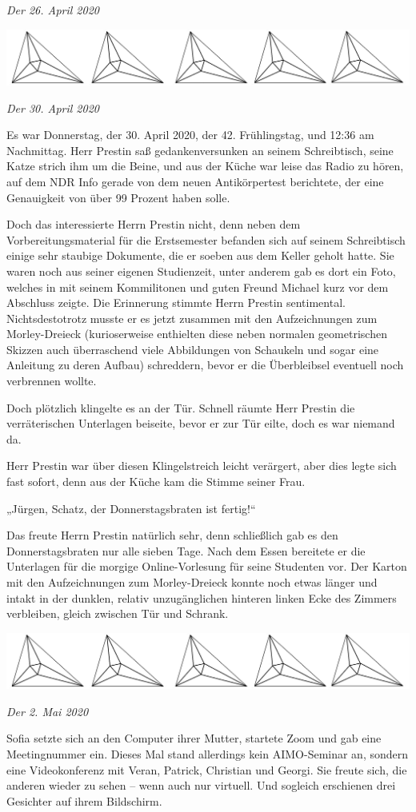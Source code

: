 \documentclass[oneside]{memoir}
\newcommand{\parasep}{
\bigskip
\bigskip
\begin{center} 
   \includegraphics[scale=.08]{parasep5.jpg} 
\end{center}
\bigskip
\bigskip
}
\begin{document}
\textit{Der 26. April 2020} \\ 

     
\parasep

\textit{Der 30. April 2020}

Es war Donnerstag, der 30. April 2020, der 42. Frühlingstag, und 12:36 am Nachmittag. Herr Prestin saß gedankenversunken an seinem Schreibtisch, seine Katze strich ihm um die Beine, und aus der Küche war leise das Radio zu hören, auf dem NDR Info gerade von dem neuen Antikörpertest berichtete, der eine Genauigkeit von über 99 Prozent haben solle.

Doch das interessierte Herrn Prestin nicht, denn neben dem Vorbereitungsmaterial für die Erstsemester befanden sich auf seinem Schreibtisch einige sehr staubige Dokumente, die er soeben aus dem Keller geholt hatte. Sie waren noch aus seiner eigenen Studienzeit, unter anderem gab es dort ein Foto, welches in mit seinem Kommilitonen und guten Freund Michael kurz vor dem Abschluss zeigte. Die Erinnerung stimmte Herrn Prestin sentimental. Nichtsdestotrotz musste er es jetzt zusammen mit den Aufzeichnungen zum Morley-Dreieck (kurioserweise enthielten diese neben normalen geometrischen Skizzen auch überraschend viele Abbildungen von Schaukeln und sogar eine Anleitung zu deren Aufbau) schreddern, bevor er die Überbleibsel eventuell noch verbrennen wollte.

Doch plötzlich klingelte es an der Tür. Schnell räumte Herr Prestin die verräterischen Unterlagen beiseite, bevor er zur Tür eilte, doch es war niemand da.

Herr Prestin war über diesen Klingelstreich leicht verärgert, aber dies legte sich fast sofort, denn aus der Küche kam die Stimme seiner Frau.

„Jürgen, Schatz, der Donnerstagsbraten ist fertig!“

Das freute Herrn Prestin natürlich sehr, denn schließlich gab es den Donnerstagsbraten nur alle sieben Tage. Nach dem Essen bereitete er die Unterlagen für die morgige Online-Vorlesung für seine Studenten vor. Der Karton mit den Aufzeichnungen zum Morley-Dreieck konnte noch etwas länger und intakt in der dunklen, relativ unzugänglichen hinteren linken Ecke des Zimmers verbleiben, gleich zwischen Tür und Schrank.
     
\parasep

\textit{Der 2. Mai 2020}

Sofia setzte sich an den Computer ihrer Mutter, startete Zoom und gab eine Meetingnummer ein. Dieses Mal stand allerdings kein AIMO-Seminar an, sondern eine Videokonferenz mit Veran, Patrick, Christian und Georgi. Sie freute sich, die anderen wieder zu sehen – wenn auch nur virtuell. Und sogleich erschienen drei Gesichter auf ihrem Bildschirm.
\end{document}
